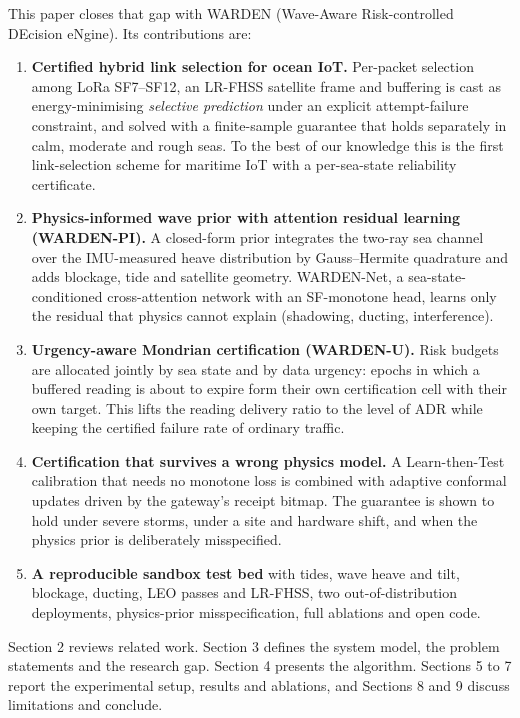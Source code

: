 \documentclass[
  11pt,
]{article}
\providecommand{\tightlist}{%
  \setlength{\itemsep}{0pt}\setlength{\parskip}{0pt}}
\begin{document}
This paper closes that gap with WARDEN (Wave-Aware Risk-controlled
DEcision eNgine). Its contributions are:

\begin{enumerate}
\def\labelenumi{\arabic{enumi}.}
\tightlist
\item
  \textbf{Certified hybrid link selection for ocean IoT.} Per-packet
  selection among LoRa SF7--SF12, an LR-FHSS satellite frame and
  buffering is cast as energy-minimising \emph{selective prediction}
  under an explicit attempt-failure constraint, and solved with a
  finite-sample guarantee that holds separately in calm, moderate and
  rough seas. To the best of our knowledge this is the first
  link-selection scheme for maritime IoT with a per-sea-state
  reliability certificate.
\item
  \textbf{Physics-informed wave prior with attention residual learning
  (WARDEN-PI).} A closed-form prior integrates the two-ray sea channel
  over the IMU-measured heave distribution by Gauss--Hermite quadrature
  and adds blockage, tide and satellite geometry. WARDEN-Net, a
  sea-state-conditioned cross-attention network with an SF-monotone
  head, learns only the residual that physics cannot explain (shadowing,
  ducting, interference).
\item
  \textbf{Urgency-aware Mondrian certification (WARDEN-U).} Risk budgets
  are allocated jointly by sea state and by data urgency: epochs in
  which a buffered reading is about to expire form their own
  certification cell with their own target. This lifts the reading
  delivery ratio to the level of ADR while keeping the certified failure
  rate of ordinary traffic.
\item
  \textbf{Certification that survives a wrong physics model.} A
  Learn-then-Test calibration that needs no monotone loss is combined
  with adaptive conformal updates driven by the gateway's receipt
  bitmap. The guarantee is shown to hold under severe storms, under a
  site and hardware shift, and when the physics prior is deliberately
  misspecified.
\item
  \textbf{A reproducible sandbox test bed} with tides, wave heave and
  tilt, blockage, ducting, LEO passes and LR-FHSS, two
  out-of-distribution deployments, physics-prior misspecification, full
  ablations and open code.
\end{enumerate}

Section 2 reviews related work. Section 3 defines the system model, the
problem statements and the research gap. Section 4 presents the
algorithm. Sections 5 to 7 report the experimental setup, results and
ablations, and Sections 8 and 9 discuss limitations and conclude.
\end{document}
